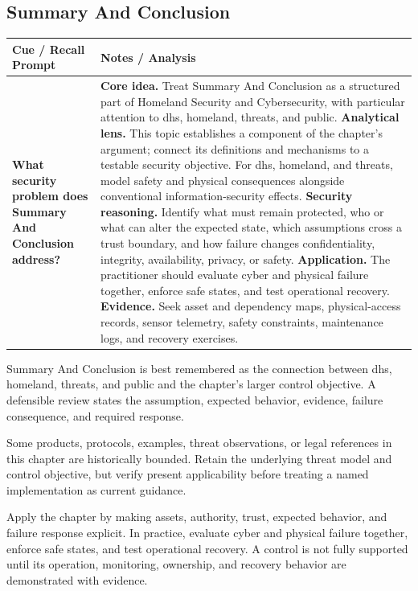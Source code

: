 \documentclass[11pt]{article}
\newcommand{\CornellHeader}{%
\rowcolor{Navy}\color{white}\bfseries Cue / Recall Prompt & \color{white}\bfseries Notes / Analysis\\\hline}
\newcommand{\CornellRow}[2]{%
\cellcolor{CueGray}\RaggedRight\textbf{#1} & \RaggedRight #2\\\hline}
\begin{document}
\subsection*{Summary And Conclusion}
\begin{longtable}{>{\RaggedRight\arraybackslash}p{}|>{\RaggedRight\arraybackslash}p{}}
\CornellHeader
\CornellRow{What security problem does Summary And Conclusion address?}{\textbf{Core idea.} Treat Summary And Conclusion as a structured part of Homeland Security and Cybersecurity, with particular attention to dhs, homeland, threats, and public. \textbf{Analytical lens.} This topic establishes a component of the chapter's argument; connect its definitions and mechanisms to a testable security objective. For dhs, homeland, and threats, model safety and physical consequences alongside conventional information-security effects. \textbf{Security reasoning.} Identify what must remain protected, who or what can alter the expected state, which assumptions cross a trust boundary, and how failure changes confidentiality, integrity, availability, privacy, or safety. \textbf{Application.} The practitioner should evaluate cyber and physical failure together, enforce safe states, and test operational recovery. \textbf{Evidence.} Seek asset and dependency maps, physical-access records, sensor telemetry, safety constraints, maintenance logs, and recovery exercises.}
\end{longtable}
\begin{topicsummary}
Summary And Conclusion is best remembered as the connection between dhs, homeland, threats, and public and the chapter's larger control objective. A defensible review states the assumption, expected behavior, evidence, failure consequence, and required response.
\end{topicsummary}
\begin{historybox}
Some products, protocols, examples, threat observations, or legal references in this chapter are historically bounded. Retain the underlying threat model and control objective, but verify present applicability before treating a named implementation as current guidance.
\end{historybox}
\begin{defensebox}
Apply the chapter by making assets, authority, trust, expected behavior, and failure response explicit. In practice, evaluate cyber and physical failure together, enforce safe states, and test operational recovery. A control is not fully supported until its operation, monitoring, ownership, and recovery behavior are demonstrated with evidence.
\end{defensebox}
\end{document}
